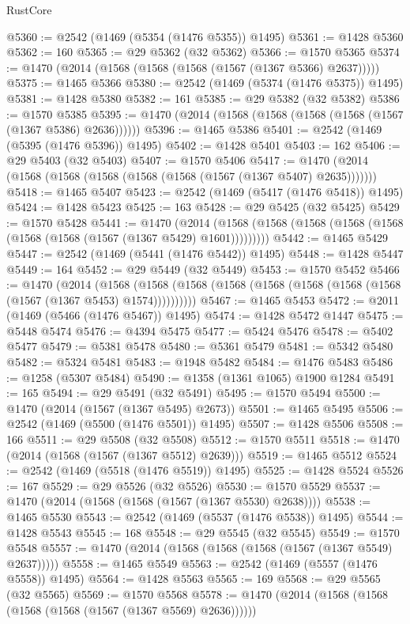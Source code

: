 \begin{lexlean}{RustCore}
\begin{coremodule}
{\begin{coremodule}
{{{{{{{{{{{{{{{{{{{{{{{{{{{{{{{{{{{{{{{{{{{{{{{@5360 := @2542 (@1469 (@5354 (@1476 @5355)) @1495)
@5361 := @1428 @5360
@5362 := 160
@5365 := @29 @5362 (@32 @5362)
@5366 := @1570 @5365
@5374 := @1470 (@2014 (@1568 (@1568 (@1568 (@1567 (@1367 @5366) @2637)))))
@5375 := @1465 @5366
@5380 := @2542 (@1469 (@5374 (@1476 @5375)) @1495)
@5381 := @1428 @5380
@5382 := 161
@5385 := @29 @5382 (@32 @5382)
@5386 := @1570 @5385
@5395 := @1470 (@2014 (@1568 (@1568 (@1568 (@1568 (@1567 (@1367 @5386) @2636))))))
@5396 := @1465 @5386
@5401 := @2542 (@1469 (@5395 (@1476 @5396)) @1495)
@5402 := @1428 @5401
@5403 := 162
@5406 := @29 @5403 (@32 @5403)
@5407 := @1570 @5406
@5417 := @1470 (@2014 (@1568 (@1568 (@1568 (@1568 (@1568 (@1567 (@1367 @5407) @2635)))))))
@5418 := @1465 @5407
@5423 := @2542 (@1469 (@5417 (@1476 @5418)) @1495)
@5424 := @1428 @5423
@5425 := 163
@5428 := @29 @5425 (@32 @5425)
@5429 := @1570 @5428
@5441 := @1470
    (@2014 (@1568 (@1568 (@1568 (@1568 (@1568 (@1568 (@1568 (@1567 (@1367 @5429) @1601)))))))))
@5442 := @1465 @5429
@5447 := @2542 (@1469 (@5441 (@1476 @5442)) @1495)
@5448 := @1428 @5447
@5449 := 164
@5452 := @29 @5449 (@32 @5449)
@5453 := @1570 @5452
@5466 := @1470
    (@2014
      (@1568 (@1568 (@1568 (@1568 (@1568 (@1568 (@1568 (@1568 (@1567 (@1367 @5453) @1574))))))))))
@5467 := @1465 @5453
@5472 := @2011 (@1469 (@5466 (@1476 @5467)) @1495)
@5474 := @1428 @5472 @1447
@5475 := @5448 @5474
@5476 := @4394 @5475
@5477 := @5424 @5476
@5478 := @5402 @5477
@5479 := @5381 @5478
@5480 := @5361 @5479
@5481 := @5342 @5480
@5482 := @5324 @5481
@5483 := @1948 @5482
@5484 := @1476 @5483
@5486 := @1258 (@5307 @5484)
@5490 := @1358 (@1361 @1065) @1900 @1284
@5491 := 165
@5494 := @29 @5491 (@32 @5491)
@5495 := @1570 @5494
@5500 := @1470 (@2014 (@1567 (@1367 @5495) @2673))
@5501 := @1465 @5495
@5506 := @2542 (@1469 (@5500 (@1476 @5501)) @1495)
@5507 := @1428 @5506
@5508 := 166
@5511 := @29 @5508 (@32 @5508)
@5512 := @1570 @5511
@5518 := @1470 (@2014 (@1568 (@1567 (@1367 @5512) @2639)))
@5519 := @1465 @5512
@5524 := @2542 (@1469 (@5518 (@1476 @5519)) @1495)
@5525 := @1428 @5524
@5526 := 167
@5529 := @29 @5526 (@32 @5526)
@5530 := @1570 @5529
@5537 := @1470 (@2014 (@1568 (@1568 (@1567 (@1367 @5530) @2638))))
@5538 := @1465 @5530
@5543 := @2542 (@1469 (@5537 (@1476 @5538)) @1495)
@5544 := @1428 @5543
@5545 := 168
@5548 := @29 @5545 (@32 @5545)
@5549 := @1570 @5548
@5557 := @1470 (@2014 (@1568 (@1568 (@1568 (@1567 (@1367 @5549) @2637)))))
@5558 := @1465 @5549
@5563 := @2542 (@1469 (@5557 (@1476 @5558)) @1495)
@5564 := @1428 @5563
@5565 := 169
@5568 := @29 @5565 (@32 @5565)
@5569 := @1570 @5568
@5578 := @1470 (@2014 (@1568 (@1568 (@1568 (@1568 (@1567 (@1367 @5569) @2636))))))
}}}}}}}}}}}}}}}}}}}}}}}}}}}}}}}}}}}}}}}}}}}}}}}
\end{coremodule}}
\end{coremodule}
\end{lexlean}
